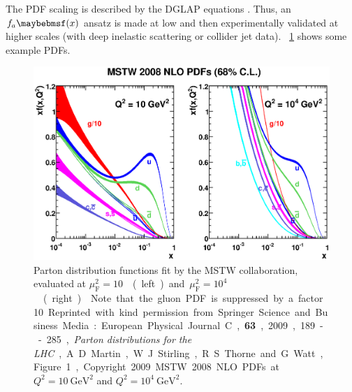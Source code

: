 The PDF \muf scaling is described by the DGLAP equations 
\cite{Gribov:1972,Altarelli:1977,Dokshitser:1977}. Thus, an $f_a \parenths{x}$ ansatz is 
made at low \muf and then experimentally validated at higher scales (\eg with deep 
inelastic scattering or collider jet data). \Figure~\ref{fig:qcd:pdf} shows some example 
PDFs.

\begin{figure}[t]
	\includegraphics[width=\largefigwidth]{tex/tools/pdf}
	\caption{Parton distribution functions fit by the MSTW collaboration, evaluated at 
	\unit{$\mu_{\text{F}}^2 = 10$}{\GeV\squared} (left) and 
	\unit{$\mu_{\text{F}}^2 = 10^4$}{\GeV\squared} (right) \cite{MSTW}. Note that the 
	gluon PDF is suppressed by a factor 10. Reprinted with kind permission from Springer 
	Science and Business Media: European Physical Journal~C, \textbf{63}, 2009, 189--285, 
	\textit{Parton distributions for the LHC}, A.~D.~Martin, W.~J.~Stirling, R.~S.~Thorne 
	and G.~Watt, Figure~1, Copyright 2009. MSTW 2008 NLO PDFs at $Q^2 = 10~\text{GeV}^2$ and 
	$Q^2 = 10^4~\text{GeV}^2$.}
	\label{fig:qcd:pdf}
\end{figure}
